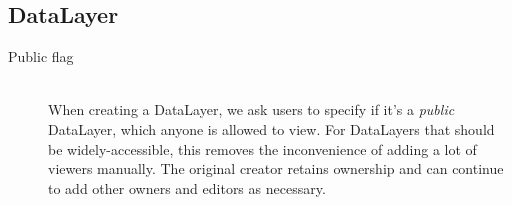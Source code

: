 
\subsection{DataLayer}
\begin{description}
\item[Public flag] \hfill \\
When creating a DataLayer, we ask users to specify if it's a \textit{public} DataLayer, which anyone is allowed to view. For DataLayers that should be widely-accessible, this removes the inconvenience of adding a lot of viewers manually. The original creator retains ownership and can continue to add other owners and editors as necessary.
\end{description}














\label{design_srid}
